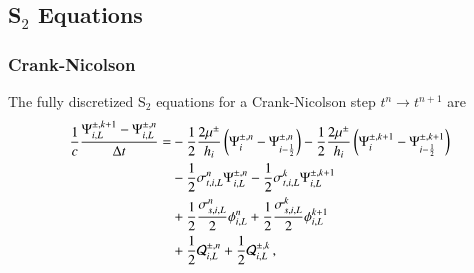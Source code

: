 \subsection{\texorpdfstring{S$_2$}{S-2} Equations}
\subsubsection{Crank-Nicolson}
The fully discretized S$_2$ equations for a Crank-Nicolson step
$t^n\rightarrow t^{n+1}$ are
\begin{equation}\lequ{S2CNfullL}\begin{split}
  \frac{1}{c}\frac{\Psi\iL^{\pm,k+1}-\Psi\iL^{\pm,n}}{\dt} = &
  -\half\frac{2\mu^\pm}{h_i}\fn{\Psi^{\pm,n}_i - \Psi^{\pm,n}_{i-\half}}
  -\half\frac{2\mu^\pm}{h_i}\fn{\Psi^{\pm,k+1}_i - \Psi^{\pm,k+1}_{i-\half}}\\
  &-\half\sigma_{t,i,L}^n\Psi\iL^{\pm,n}
   -\half\sigma_{t,i,L}^k\Psi\iL^{\pm,k+1}\\
  &+\half\frac{\sigma_{s,i,L}^n}{2}\phi\iL^n
   +\half\frac{\sigma_{s,i,L}^k}{2}\phi\iL^{k+1}\\
  &+\half\Q_{i,L}^{\pm,n}
   +\half\Q_{i,L}^{\pm,k} \pec
\end{split}\end{equation}


